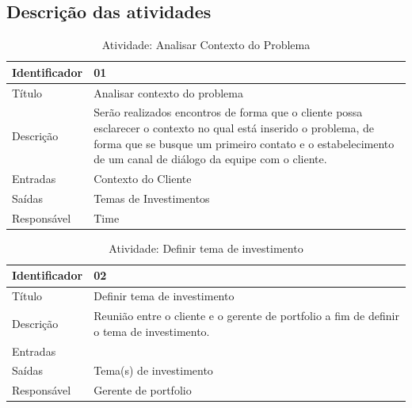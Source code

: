 \subsection{Descrição das atividades}


\begin{table}[]
\centering
\caption{Atividade: Analisar Contexto do Problema}
\label{atividade:1}
\begin{tabularx}{0.9\textwidth}{|>{}s |b|}
\hline
Identificador & 01                                                                  \\ \hline
Título        & Analisar contexto do problema                                       \\ \hline
Descrição     & Serão realizados encontros de forma que o cliente possa esclarecer o contexto no qual está inserido o problema, de forma que se busque um primeiro contato e o estabelecimento de um canal de diálogo da equipe com o cliente. \\ \hline
Entradas       & Contexto do Cliente                                                  \\ \hline
Saídas         & Temas de Investimentos                                               \\ \hline
Responsável   & Time                                                                  \\ \hline
\end{tabularx}
\end{table}

\begin{table}[]
\centering
\caption{Atividade: Definir tema de investimento}
\label{atividade:2}
\begin{tabularx}{0.9\textwidth}{|>{}s |b|}
\hline
Identificador & 02                                                                    \\ \hline
Título        & Definir tema de investimento                                          \\ \hline
Descrição     & Reunião entre o cliente e o gerente de portfolio a fim de definir o tema de investimento. \\ \hline
Entradas      &                                                                       \\ \hline
Saídas        & Tema(s) de investimento                                               \\ \hline
Responsável   & Gerente de portfolio                                                  \\ \hline
\end{tabularx}
\end{table}

